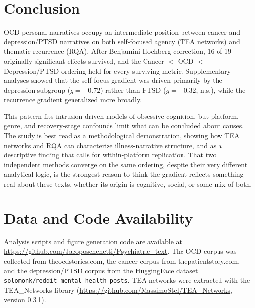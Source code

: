 \documentclass[11pt,a4paper]{article}
\begin{document}
\section{Conclusion}

OCD personal narratives occupy an intermediate position between cancer and depression/PTSD narratives on both self-focused agency (TEA networks) and thematic recurrence (RQA). After Benjamini-Hochberg correction, 16 of 19 originally significant effects survived, and the Cancer $<$ OCD $<$ Depression/PTSD ordering held for every surviving metric. Supplementary analyses showed that the self-focus gradient was driven primarily by the depression subgroup ($g = -0.72$) rather than PTSD ($g = -0.32$, n.s.), while the recurrence gradient generalized more broadly.

This pattern fits intrusion-driven models of obsessive cognition, but platform, genre, and recovery-stage confounds limit what can be concluded about causes. The study is best read as a methodological demonstration, showing how TEA networks and RQA can characterize illness-narrative structure, and as a descriptive finding that calls for within-platform replication. That two independent methods converge on the same ordering, despite their very different analytical logic, is the strongest reason to think the gradient reflects something real about these texts, whether its origin is cognitive, social, or some mix of both.

\section*{Data and Code Availability}

Analysis scripts and figure generation code are available at \url{https://github.com/Jacoposchenetti/Psychiatric_text}. The OCD corpus was collected from theocdstories.com, the cancer corpus from thepatientstory.com, and the depression/PTSD corpus from the HuggingFace dataset \texttt{solomonk/reddit\_mental\_health\_posts}. TEA networks were extracted with the TEA\_Networks library (\url{https://github.com/MassimoStel/TEA_Networks}, version 0.3.1).


\end{document}
